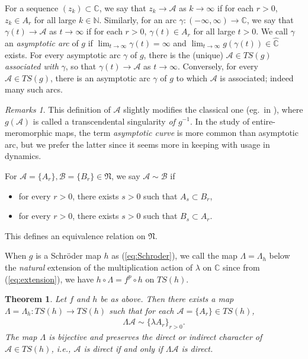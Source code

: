\documentclass[a4paper,12pt]{amsart}
\theoremstyle{plain}
\newtheorem{theorem}[equation]{Theorem}
\theoremstyle{definition}
\theoremstyle{remark}
\newtheorem*{remarks}{Remarks}
\numberwithin{equation}{section}
\begin{document}
For a sequence $(z_k)\subset{\mathbb{C}}$, we say that 
$z_k\to\mathcal{A}$ as $k\to\infty$ if for each $r>0$,
$z_k\in A_r$ for all large $k\in{\mathbb{N}}$.
Similarly, for an arc $\gamma:(-\infty,\infty)\to{\mathbb{C}}$, 
we say that $\gamma(t)\to\mathcal{A}$ as $t\to\infty$ 
if for each $r>0$, $\gamma(t)\in A_r$ for all large $t>0$.
We call $\gamma$ an {\itshape asymptotic arc} of $g$
if $\lim_{t\to\infty}\gamma(t)=\infty$ and $\lim_{t\to\infty}g(\gamma(t))\in{\hat{\mathbb{C}}}$ exists.
For every asymptotic arc $\gamma$ of $g$,
there is the (unique) $\mathcal{A}\in{\mathit{TS}}(g)$ {\itshape associated with} $\gamma$,
so that $\gamma(t)\to\mathcal{A}$ as $t\to\infty$.
Conversely, for every $\mathcal{A}\in{\mathit{TS}}(g)$,
there is an asymptotic arc $\gamma$ of $g$ to  which $\mathcal{A}$ is associated;
indeed many such arcs.

\begin{remarks}
 This definition of $\mathcal{A}$ slightly modifies the classical
 one (eg.\ in \cite[\S XI]{Nevan70}), where $g(\mathcal{A})$ 
 is called a transcendental singularity {\itshape of $g^{-1}$}.
 In the study of entire-meromorphic maps, the term
 {\itshape asymptotic curve} is more common than asymptotic arc,
 but we prefer the latter since it seems more in keeping with usage in dynamics.
\end{remarks}

For $\mathcal{A}=\{A_r\},\mathcal{B}=\{B_r\}\in\mathfrak{N}$,
we say $\mathcal{A}\sim\mathcal{B}$ if
\begin{itemize}
 \item for every $r>0$, there exists $s>0$ such that $A_s\subset B_r$,
       \label{item:pushtail}
 \item for every $r>0$, there exists $s>0$ such that $B_s\subset A_r$.
       \label{item:directindirect}
\end{itemize}
This defines an equivalence relation on $\mathfrak{N}$.

When $g$ is a Schr\"oder map $h$ as (\ref{eq:Schroder}),
we call the map $\Lambda=\Lambda_h$ below
the {\itshape natural} extension of the multiplication action of $\lambda$ on ${\mathbb{C}}$
since from (\ref{eq:extension}), we have $h\circ\Lambda=f^p\circ h$ on ${\mathit{TS}}(h)$.

\begin{theorem}\label{th:extension}
 Let $f$ and $h$ be as above. Then
 there exists a map $\Lambda=\Lambda_h:{\mathit{TS}}(h)\to{\mathit{TS}}(h)$
 such that for each $\mathcal{A}=\{A_r\}\in{\mathit{TS}}(h)$,
 \begin{gather}
  \Lambda\mathcal{A}\sim\{\lambda A_r\}_{r>0}.\label{eq:extension}
 \end{gather}
 The map $\Lambda$ is bijective and
 preserves the direct or indirect character of $\mathcal{A}\in{\mathit{TS}}(h)$, i.e.,
 $\mathcal{A}$ is direct if and only if $\Lambda\mathcal{A}$ is direct.
\end{theorem}
\end{document}
